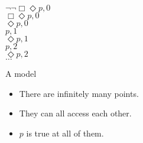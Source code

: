 \documentclass[
  14pt,
  letterpaper,
  ignorenonframetext,
]{beamer}
\providecommand{\tightlist}{%
  \setlength{\itemsep}{0pt}\setlength{\parskip}{0pt}}\usepackage{longtable,booktabs,array}
\begin{document}
\begin{frame}
\begin{center}
$\neg \neg \Box \Diamond p, 0$ \\
$\Box \Diamond p, 0$ \\
$\Diamond p, 0$ \\
$p, 1$ \\
$\Diamond p, 1$ \\
$p, 2$ \\
$\Diamond p, 2$ \\
$\dots$
\end{center}

A model

\begin{itemize}
\tightlist
\item
  There are infinitely many points.
\item
  They can all access each other.
\item
  \(p\) is true at all of them.
\end{itemize}
\end{frame}
\end{document}

